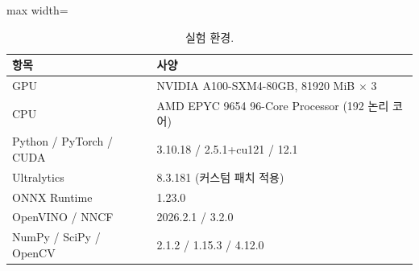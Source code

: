 \begin{table}[htbp]
\centering
\small
\caption{실험 환경.}
\label{tab:env}
\begin{adjustbox}{max width=\linewidth}
\begin{tabular}{ll}
\toprule
항목 & 사양 \\
\midrule
GPU & NVIDIA A100-SXM4-80GB, 81920 MiB $\times$ 3 \\
CPU & AMD EPYC 9654 96-Core Processor (192 논리 코어) \\
Python / PyTorch / CUDA & 3.10.18 / 2.5.1+cu121 / 12.1 \\
Ultralytics & 8.3.181 (커스텀 패치 적용) \\
ONNX Runtime & 1.23.0 \\
OpenVINO / NNCF & 2026.2.1 / 3.2.0 \\
NumPy / SciPy / OpenCV & 2.1.2 / 1.15.3 / 4.12.0 \\
\bottomrule
\end{tabular}
\end{adjustbox}
\end{table}
